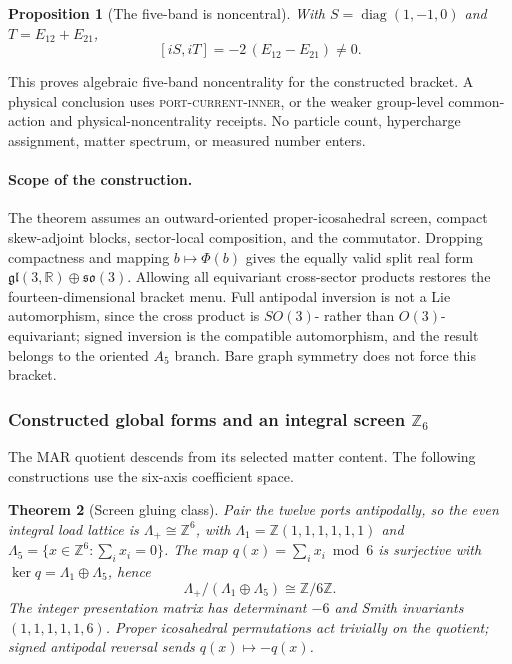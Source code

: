 \documentclass[11pt]{article}
\newtheorem{theorem}{Theorem}[section]
\newtheorem{proposition}[theorem]{Proposition}
\begin{document}
\begin{proposition}[The five-band is noncentral]
With \(S=\operatorname{diag}(1,-1,0)\) and \(T=E_{12}+E_{21}\),
\[
  [iS,iT]=-2\,(E_{12}-E_{21})\neq0 .
\]
\end{proposition}

This proves algebraic five-band noncentrality for the constructed bracket. A
physical conclusion uses \textsc{port-current-inner}, or the weaker
group-level common-action and physical-noncentrality receipts. No particle
count, hypercharge assignment, matter spectrum, or measured number enters.

\paragraph{Scope of the construction.} The theorem assumes an outward-oriented
proper-icosahedral screen, compact skew-adjoint blocks, sector-local composition,
and the commutator.
Dropping compactness and mapping \(b\mapsto\Phi(b)\) gives the equally valid
split real form \(\mathfrak{gl}(3,\mathbb R)\oplus\mathfrak{so}(3)\). Allowing all
equivariant cross-sector products restores the fourteen-dimensional bracket
menu. Full antipodal inversion is not a Lie automorphism, since the cross product
is \(SO(3)\)- rather than \(O(3)\)-equivariant; signed inversion is the
compatible automorphism, and the result belongs to the oriented \(A_5\) branch.
Bare graph symmetry does not force this bracket.

\subsubsection*{Constructed global forms and an integral screen
\texorpdfstring{$\mathbb Z_6$}{Z6}}

The MAR quotient descends from its selected matter content. The following
constructions use the six-axis coefficient space.

\begin{theorem}[Screen gluing class]
Pair the twelve ports antipodally, so the even integral load lattice is
\(\Lambda_+\cong\mathbb Z^6\), with
\(\Lambda_1=\mathbb Z(1,1,1,1,1,1)\) and
\(\Lambda_5=\{x\in\mathbb Z^6:\sum_ix_i=0\}\). The map
\(q(x)=\sum_ix_i \bmod 6\) is surjective with \(\ker q=\Lambda_1\oplus\Lambda_5\),
hence
\[
  \Lambda_+/(\Lambda_1\oplus\Lambda_5)\cong\mathbb Z/6\mathbb Z .
\]
The integer presentation matrix has determinant \(-6\) and Smith invariants
\((1,1,1,1,1,6)\). Proper icosahedral permutations act trivially on the
quotient; signed antipodal reversal sends \(q(x)\mapsto-q(x)\).
\end{theorem}
\end{document}
